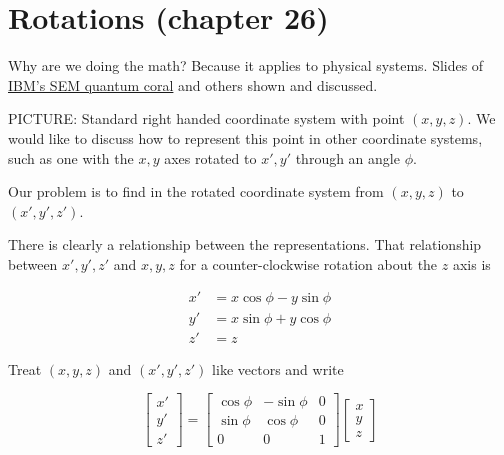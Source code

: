 %
%

\section{Rotations (chapter 26)}

Why are we doing the math?  Because it applies to physical systems.  Slides of \href{http://www.almaden.ibm.com/vis/stm/images/stm.gif}{IBM's SEM quantum coral} and others shown and discussed.

PICTURE: Standard right handed coordinate system with point \((x,y,z)\). We would like to discuss how to represent this point in other coordinate systems, such as one with the \(x,y\) axes rotated to \(x',y'\) through an angle \(\phi\).

Our problem is to find in the rotated coordinate system from \((x,y,z)\) to \((x', y', z')\).

There is clearly a relationship between the representations.  That relationship between \(x', y', z'\) and \(x,y,z\) for a counter-clockwise rotation about the \(z\) axis is

\begin{equation}\label{eqn:PHY356FDec7:10}
\begin{aligned}
x' &= x \cos \phi - y \sin\phi \\
y' &= x \sin \phi + y \cos\phi \\
z' &= z
\end{aligned}
\end{equation}

Treat \((x,y,z)\) and \((x',y',z')\) like vectors and write

\begin{equation}\label{eqn:PHY356FDec7:20}
\begin{bmatrix}
x'  \\
y' \\
z'
\end{bmatrix}
=
\begin{bmatrix}
\cos \phi &- \sin\phi & 0 \\
\sin \phi & \cos\phi & 0 \\
0 & 0 & 1
\end{bmatrix}
\begin{bmatrix}
x  \\
y \\
z
\end{bmatrix}
\end{equation}

